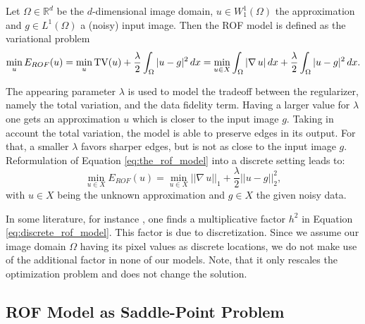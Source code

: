     \begin{definition} %
    \label{def:the_rof_model}

        Let $\Omega \in \mathbb{R}^{d}$ be the $d$-dimensional image domain, $u \in W_{1}^{1}(\Omega)$ the approximation and $g \in L^{1}(\Omega)$ a (noisy) input image. Then the ROF model is defined as the variational problem
            \begin{equation}
                \min_{u} E_{ROF}(u) = \min_{u} \textnormal{TV}(u) + \frac{\lambda}{2} \int_{\Omega} |u - g|^{2} \, dx = \min_{u \in X} \int_{\Omega} |\nabla \, u| \, dx + \frac{\lambda}{2} \int_{\Omega} |u - g|^{2} \, dx.
                \label{eq:the_rof_model}
            \end{equation}

    \end{definition}

    The appearing parameter $\lambda$ is used to model the tradeoff between the regularizer, namely the total variation, and the data fidelity term. Having a larger value for $\lambda$ one gets an approximation $u$ which is closer to the input image $g$. Taking in account the total variation, the model is able to preserve edges in its output. For that, a smaller $\lambda$ favors sharper edges, but is not as close to the input image $g$. Reformulation of Equation \ref{eq:the_rof_model} into a discrete setting leads to:
        \begin{equation}
            \min_{u \in X} E_{ROF}(u) = \min_{u \in X} ||\nabla \, u||_{1} + \frac{\lambda}{2} ||u - g||_{2}^{2},
        \label{eq:discrete_rof_model}
        \end{equation}
    with $u \in X$ being the unknown approximation and $g \in X$ the given noisy data.

    \begin{remark} %
        In some literature, for instance \cite{Chambolle10afirst-order}, one finds a multiplicative factor $h^{2}$ in Equation \ref{eq:discrete_rof_model}. This factor is due to discretization. Since we assume our image domain $\Omega$ having its pixel values as discrete locations, we do not make use of the additional factor in none of our models. Note, that it only rescales the optimization problem and does not change the solution.
    \end{remark}

    \subsection{ROF Model as Saddle-Point Problem} %
    \label{sub:rof_model_as_saddle_point_problem}


